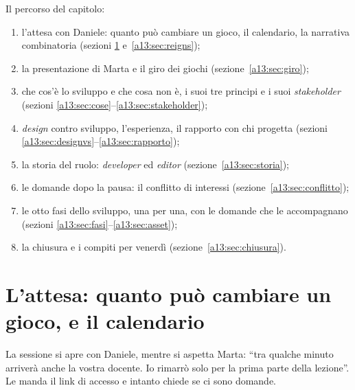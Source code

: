 Il percorso del capitolo:
\begin{enumerate}
  \item l'attesa con Daniele: quanto può cambiare un gioco, il calendario, la
        narrativa combinatoria (sezioni \ref{a13:sec:attesa} e~\ref{a13:sec:reigns});
  \item la presentazione di Marta e il giro dei giochi (sezione~\ref{a13:sec:giro});
  \item che cos'è lo sviluppo e che cosa non è, i suoi tre principi e i suoi
        \emph{stakeholder} (sezioni \ref{a13:sec:cose}--\ref{a13:sec:stakeholder});
  \item \emph{design} contro sviluppo, l'esperienza, il rapporto con chi progetta
        (sezioni \ref{a13:sec:designvs}--\ref{a13:sec:rapporto});
  \item la storia del ruolo: \emph{developer} ed \emph{editor}
        (sezione~\ref{a13:sec:storia});
  \item le domande dopo la pausa: il conflitto di interessi
        (sezione~\ref{a13:sec:conflitto});
  \item le otto fasi dello sviluppo, una per una, con le domande che le
        accompagnano (sezioni \ref{a13:sec:fasi}--\ref{a13:sec:asset});
  \item la chiusura e i compiti per venerdì (sezione~\ref{a13:sec:chiusura}).
\end{enumerate}

\section{L'attesa: quanto può cambiare un gioco, e il calendario}
\label{a13:sec:attesa}

La sessione si apre con Daniele, mentre si aspetta Marta: ``tra qualche minuto arriverà
anche la vostra docente. Io rimarrò solo per la prima parte della lezione''. Le manda
il link di accesso e intanto chiede se ci sono domande.

